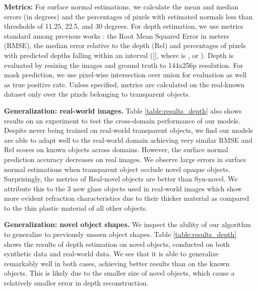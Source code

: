 \documentclass[letterpaper, 10 pt, conference]{ieeeconf}
\newcommand{\myparagraph}[1]{\vspace{0.03in}\noindent\textbf{#1}}
\begin{document}
\myparagraph{Metrics:}
For surface normal estimations, we calculate the mean and median errors (in degrees) and the percentages of pixels with estimated normals less than thresholds of 11.25, 22.5, and 30 degrees.
For depth estimation, we use metrics standard among previous works \cite{corr2014EigenPF}: the Root Mean Squared Error in meters (RMSE), the median error relative to the depth (Rel) and percentages of pixels with predicted depths falling within an interval ([], where  is ,  or ). Depth is evaluated by resizing the images and ground truth to 144x256p resolution.
For mask prediction, we use pixel-wise intersection over union for evaluation as well as true positive rate. 
Unless specified, metrics are calculated on the real-known dataset only over the pixels belonging to transparent objects.


\myparagraph{Generalization: real-world images.}
Table \ref{table:results_depth} also shows results on an experiment to test the cross-domain performance of our models. Despite never being trained on real-world transparent objects, we find our models are able to adapt well to the real-world domain achieving very similar RMSE and Rel scores on known objects across domains. However, the surface normal prediction accuracy decreases on real images. We observe large errors in surface normal estimations when transparent object occlude novel opaque objects. 
Surprisingly, the metrics of Real-novel objects are better than Syn-novel. We attribute this to the 3 new glass objects used in real-world images which show more evident refraction characteristics due to their thicker material as compared to the thin plastic material of all other objects.

\myparagraph{Generalization: novel object shapes.}
We inspect the ability of our algorithm to generalize to previously unseen object shapes. Table \ref{table:results_depth} shows the results of depth estimation on novel objects, conducted on both synthetic data and real-world data. We see that it is able to generalize remarkably well in both cases, achieving better results than on the known objects. This is likely due to the smaller size of novel objects, which cause a relatively smaller error in depth reconstruction.
\end{document}
